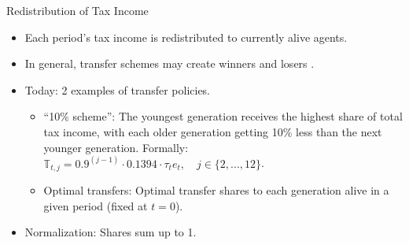 \documentclass[aspectratio=169,11pt]{beamer}
\newcommand{\keyc}[1]{\textcolor{uzhblue}{#1}}
\begin{document}
\begin{frame}[fragile]{Redistribution of Tax Income}
\begin{itemize}
    \item Each period's tax income is redistributed to currently alive agents.
    \item In general, \keyc{transfer schemes may create winners and losers} \citep{kotlikoff2021making}.
    \item Today: \keyc{2 examples of transfer policies.}
    \begin{itemize}
        \item \keyc{``10\% scheme''}: The youngest generation receives the highest share of total tax income, with each older generation getting 10\% less than the next younger generation. Formally: $\mathbb{T}_{t,j} = 0.9^{(j-1)} \cdot 0.1394 \cdot \tau_t e_t, \quad j \in \{2,...,12 \}$.
        \vspace{0.5cm}
        \item \keyc{Optimal transfers}: Optimal transfer shares to each generation alive in a given period (fixed at $t=0$).
    \end{itemize}
\end{itemize}
\begin{itemize}
    \vspace{0.5cm}
    \item Normalization: Shares sum up to 1.
\end{itemize}
\end{frame}
\end{document}
